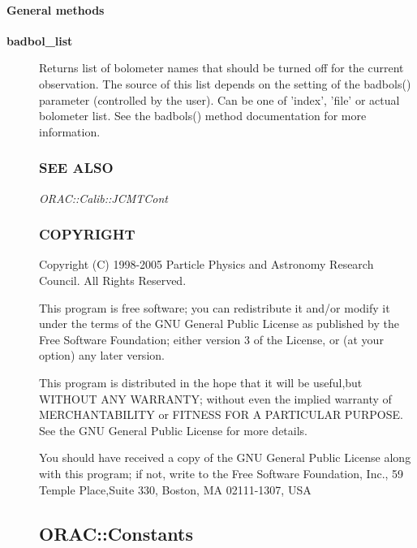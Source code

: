 \paragraph*{General methods\label{ORAC::Calib::SCUBA_General_methods}}
\begin{description}

\item[{\textbf{badbol\_list}}] \mbox{}

Returns list of bolometer names that should be turned off for the
current observation. The source of this list depends on the setting
of the badbols() parameter (controlled by the user).
Can be one of 'index', 'file' or actual bolometer list. See the
badbols() method documentation for more information.

\subsubsection*{SEE ALSO\label{ORAC::Calib::SCUBA_SEE_ALSO}}


\emph{ORAC::Calib::JCMTCont}

\subsubsection*{COPYRIGHT\label{ORAC::Calib::SCUBA_COPYRIGHT}}


Copyright (C) 1998-2005 Particle Physics and Astronomy Research
Council. All Rights Reserved.



This program is free software; you can redistribute it and/or modify it under
the terms of the GNU General Public License as published by the Free Software
Foundation; either version 3 of the License, or (at your option) any later
version.



This program is distributed in the hope that it will be useful,but WITHOUT ANY
WARRANTY; without even the implied warranty of MERCHANTABILITY or FITNESS FOR A
PARTICULAR PURPOSE. See the GNU General Public License for more details.



You should have received a copy of the GNU General Public License along with
this program; if not, write to the Free Software Foundation, Inc., 59 Temple
Place,Suite 330, Boston, MA  02111-1307, USA

\subsection{ORAC::Constants\label{ORAC::Constants}}



\end{description}
